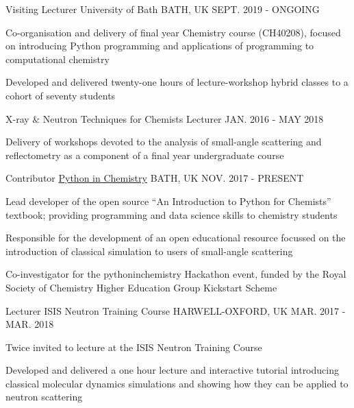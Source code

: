 \begin{cventries}
	\cventry
	{Visiting Lecturer}
	{University of Bath}
	{BATH, UK}
	{SEPT. 2019 - ONGOING}
	{
		\begin{cvitems}
			\item {Co-organisation and delivery of final year Chemistry course (CH40208), focused on introducing Python programming and applications of programming to computational chemistry}
			\item {Developed and delivered twenty-one hours of lecture-workshop hybrid classes to a cohort of seventy students}
		\end{cvitems}
	}
	\cventry
	{X-ray \& Neutron Techniques for Chemists Lecturer}
	{}
	{}
	{JAN. 2016 - MAY 2018}
	{
		\begin{cvitems}
			\item {Delivery of workshops devoted to the analysis of small-angle scattering and reflectometry as a component of a final year undergraduate course}
		\end{cvitems}
	}
	\cventry
	{Contributor}
	{\href{https://pythoninchemistry.org}{Python in Chemistry}}
	{BATH, UK}
	{NOV. 2017 - PRESENT}
	{
		\begin{cvitems}
			\item {Lead developer of the open source ``An Introduction to Python for Chemists'' textbook; providing programming and data science skills to chemistry students}
			\item {Responsible for the development of an open educational resource focussed on the introduction of classical simulation to users of small-angle scattering}
			\item {Co-investigator for the pythoninchemistry Hackathon event, funded by the Royal Society of Chemistry Higher Education Group Kickstart Scheme}
		\end{cvitems}
	}
	\cventry
	{Lecturer}
	{ISIS Neutron Training Course}
	{HARWELL-OXFORD, UK}
	{MAR. 2017 - MAR. 2018}
	{
		\begin{cvitems}
			\item {Twice invited to lecture at the ISIS Neutron Training Course}
			\item {Developed and delivered a one hour lecture and interactive tutorial introducing classical molecular dynamics simulations and showing how they can be applied to neutron scattering}
		\end{cvitems}
	}
\end{cventries}
